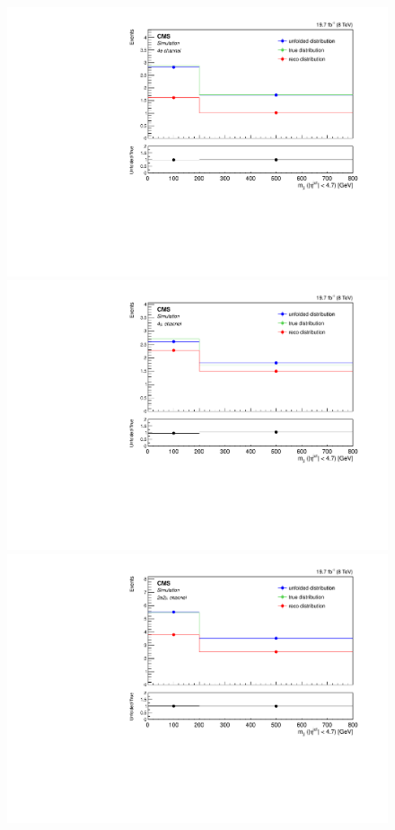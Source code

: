 \begin{figure}[hbtp]
\begin{center}
    \includegraphics[width=0.8\cmsFigWidth]{Figures/Unfolding/MCTests/Mjj_ZZTo4e_MadMatrix_MadDistr_HalfSample_fr}     
    \includegraphics[width=0.8\cmsFigWidth]{Figures/Unfolding/MCTests/Mjj_ZZTo4m_MadMatrix_MadDistr_HalfSample_fr}     
    \includegraphics[width=0.8\cmsFigWidth]{Figures/Unfolding/MCTests/Mjj_ZZTo2e2m_MadMatrix_MadDistr_HalfSample_fr}     

\end{center}
\end{figure}
